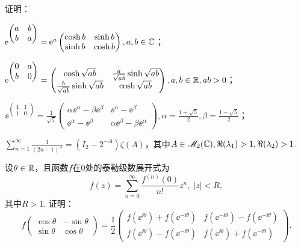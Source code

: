 \begin{problem}
  证明：
  \begin{enum}
    \item\label{prob4.32a} $\operatorname{\!\!\;\mathrm e}^{\begin{pmatrix}
      a & b \\
      b & a
    \end{pmatrix}}=\operatorname{\!\!\;\mathrm e}^a\begin{pmatrix}
      \cosh b & \sinh b \\
      \sinh b & \cosh b
    \end{pmatrix},a,b\in\mathbb C$；
    \item\label{prob4.32b} $\operatorname{\!\!\;\mathrm e}^{\begin{pmatrix}
      0 & a \\
      b & 0
    \end{pmatrix}}=\begin{pmatrix}
      \cosh\sqrt{ab} & \frac a{\sqrt{ab}}\sinh \sqrt{ab} \\
      \frac b{\sqrt{ab}}\sinh \sqrt{ab} & \cosh\sqrt{ab}
    \end{pmatrix},a,b\in\mathbb R,ab>0$；
    \item\label{prob4.32c} $\ee^{\begin{pmatrix}
      1 & 1 \\
      1 & 0
    \end{pmatrix}}=\frac1{\sqrt5}\begin{pmatrix}
      \alpha\ee^\alpha -\beta\ee^\beta & \ee^\alpha-\ee^\beta \\
      \ee^\alpha-\ee^\beta & \alpha\ee^\beta-\beta\ee^\alpha
    \end{pmatrix},\alpha=\frac{1+\sqrt5}2,\beta=
    \frac{1-\sqrt5}2$；
    \item\label{prob4.32d} $\sum_{n=1}^\infty \frac1{(2n-1)^A}=(I_2-2^{-A})\zeta(A)$，其中$A\in\mathscr M_2(\mathbb C),\Re(\lambda_1)>1,\Re(\lambda_2)
        >1$.
  \end{enum}
\end{problem}

\begin{mybox}
  \begin{problem}[旋转矩阵的函数.]

    设$\theta\in\mathbb R$，且函数$f$在0处的泰勒级数展开式为
    \[
      f(z) = \sum_{n=0}^\infty \frac{f^{(n)}(0)}{n!}z^n,\; |z|<R,
    \]
    其中$R>1$. 证明：
    \[
      f\begin{pmatrix}
        \cos\theta & -\sin\theta \\
        \sin\theta & \cos\theta
      \end{pmatrix} = \frac12 \begin{pmatrix}
        f(\ee^{\ii\theta}) + f(\ee^{-\ii\theta}) &
        f(\ee^{-\ii\theta}) - f(\ee^{-\ii\theta}) \\
        f(\ee^{\ii\theta}) - f(\ee^{-\ii\theta})
        & f(\ee^{\ii\theta}) + f(\ee^{-\ii\theta})
      \end{pmatrix}.
    \]
  \end{problem}
\end{mybox}

